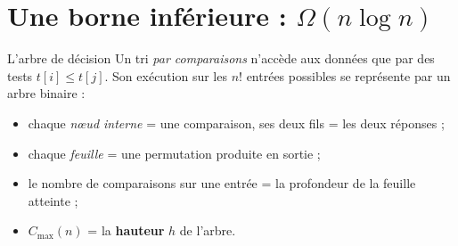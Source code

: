 \documentclass[11pt,aspectratio=169]{beamer}
\begin{document}
\section{Une borne inférieure : \texorpdfstring{$\Omega(n\log n)$}{Omega(n log n)}}

\begin{frame}{L'arbre de décision}
Un tri \emph{par comparaisons} n'accède aux données que par des tests $t[i]\le t[j]$.
Son exécution sur les $n!$ entrées possibles se représente par un arbre binaire :
\begin{center}
\end{center}
\begin{itemize}\small
  \item chaque \emph{n\oe ud interne} = une comparaison, ses deux fils = les deux réponses ;
  \item chaque \emph{feuille} = une permutation produite en sortie ;
  \item le nombre de comparaisons sur une entrée = la profondeur de la feuille atteinte ;
  \item $C_{\max}(n)$ = la \textbf{hauteur} $h$ de l'arbre.
\end{itemize}
\end{frame}
\end{document}
